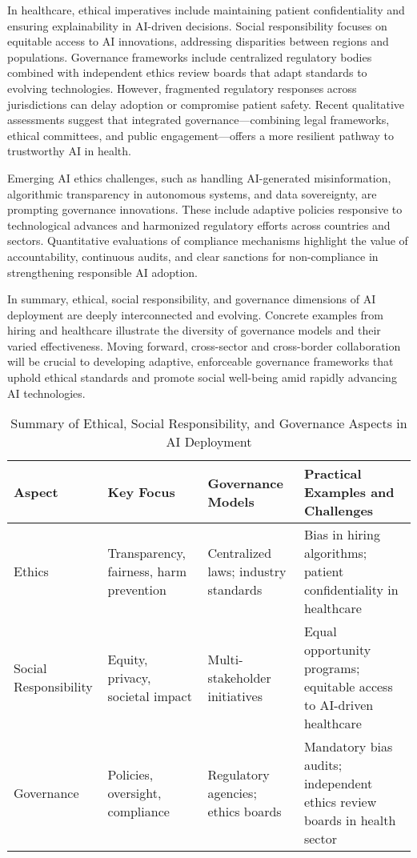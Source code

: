 \documentclass[sigconf]{acmart}
\begin{document}
In healthcare, ethical imperatives include maintaining patient confidentiality and ensuring explainability in AI-driven decisions. Social responsibility focuses on equitable access to AI innovations, addressing disparities between regions and populations. Governance frameworks include centralized regulatory bodies combined with independent ethics review boards that adapt standards to evolving technologies. However, fragmented regulatory responses across jurisdictions can delay adoption or compromise patient safety. Recent qualitative assessments suggest that integrated governance—combining legal frameworks, ethical committees, and public engagement—offers a more resilient pathway to trustworthy AI in health.

Emerging AI ethics challenges, such as handling AI-generated misinformation, algorithmic transparency in autonomous systems, and data sovereignty, are prompting governance innovations. These include adaptive policies responsive to technological advances and harmonized regulatory efforts across countries and sectors. Quantitative evaluations of compliance mechanisms highlight the value of accountability, continuous audits, and clear sanctions for non-compliance in strengthening responsible AI adoption.

In summary, ethical, social responsibility, and governance dimensions of AI deployment are deeply interconnected and evolving. Concrete examples from hiring and healthcare illustrate the diversity of governance models and their varied effectiveness. Moving forward, cross-sector and cross-border collaboration will be crucial to developing adaptive, enforceable governance frameworks that uphold ethical standards and promote social well-being amid rapidly advancing AI technologies.

\begin{table*}[htbp]
\centering
\caption{Summary of Ethical, Social Responsibility, and Governance Aspects in AI Deployment}
\label{tab:ethical_governance_summary}
\begin{adjustbox}{max width=\textwidth}
\begin{tabular}{@{}llll@{}}
\toprule
Aspect           & Key Focus                               & Governance Models & Practical Examples and Challenges                                              \\ \midrule
Ethics           & Transparency, fairness, harm prevention & Centralized laws; industry standards & Bias in hiring algorithms; patient confidentiality in healthcare              \\
Social Responsibility & Equity, privacy, societal impact        & Multi-stakeholder initiatives         & Equal opportunity programs; equitable access to AI-driven healthcare       \\
Governance       & Policies, oversight, compliance          & Regulatory agencies; ethics boards    & Mandatory bias audits; independent ethics review boards in health sector     \\ \bottomrule
\end{tabular}
\end{adjustbox}
\end{table*}
\end{document}
